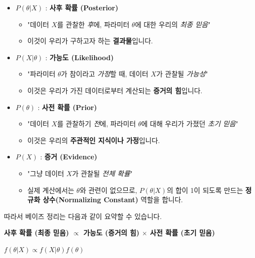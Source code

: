 \documentclass[11pt,a4paper]{book}
\theoremstyle{definition}
\begin{document}
\begin{itemize}
    \item $P(\theta | X)$ : \textbf{사후 확률 (Posterior)}
        \begin{itemize}
            \item "데이터 $X$를 관찰한 \textit{후}에, 파라미터 $\theta$에 대한 우리의 \textit{최종 믿음}"
            \item 이것이 우리가 구하고자 하는 \textbf{결과물}입니다.
        \end{itemize}
    
    \item $P(X | \theta)$ : \textbf{가능도 (Likelihood)}
        \begin{itemize}
            \item "파라미터 $\theta$가 참이라고 \textit{가정}할 때, 데이터 $X$가 관찰될 \textit{가능성}"
            \item 이것은 우리가 가진 데이터로부터 계산되는 \textbf{증거의 힘}입니다.
        \end{itemize}
        
    \item $P(\theta)$ : \textbf{사전 확률 (Prior)}
        \begin{itemize}
            \item "데이터 $X$를 관찰하기 \textit{전}에, 파라미터 $\theta$에 대해 우리가 가졌던 \textit{초기 믿음}"
            \item 이것은 우리의 \textbf{주관적인 지식이나 가정}입니다.
        \end{itemize}
        
    \item $P(X)$ : \textbf{증거 (Evidence)}
        \begin{itemize}
            \item "그냥 데이터 $X$가 관찰될 \textit{전체 확률}"
            \item 실제 계산에서는 $\theta$와 관련이 없으므로, $P(\theta | X)$의 합이 1이 되도록 만드는 \textbf{정규화 상수(Normalizing Constant)} 역할을 합니다.
        \end{itemize}
\end{itemize}

따라서 베이즈 정리는 다음과 같이 요약할 수 있습니다.

\begin{summarybox}
    \textbf{사후 확률 (최종 믿음) $\propto$ 가능도 (증거의 힘) $\times$ 사전 확률 (초기 믿음)}
    
    $f(\theta | X) \propto f(X | \theta) f(\theta)$
\end{summarybox}
\end{document}
